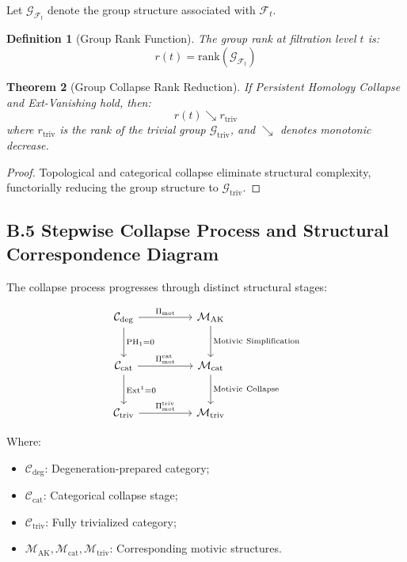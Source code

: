 \documentclass[11pt]{article}
\newtheorem{theorem}{Theorem}[section]
\newtheorem{definition}[theorem]{Definition}
\DeclareMathOperator{\Ext}{Ext}
\begin{document}
Let $\mathcal{G}_{\mathcal{F}_t}$ denote the group structure associated with $\mathcal{F}_t$.

\begin{definition}[Group Rank Function]
The group rank at filtration level $t$ is:
\[
r(t) = \mathrm{rank}(\mathcal{G}_{\mathcal{F}_t})
\]
\end{definition}

\begin{theorem}[Group Collapse Rank Reduction]
If Persistent Homology Collapse and Ext-Vanishing hold, then:
\[
r(t) \searrow r_{\mathrm{triv}}
\]
where $r_{\mathrm{triv}}$ is the rank of the trivial group $\mathcal{G}_{\mathrm{triv}}$, and $\searrow$ denotes monotonic decrease.
\end{theorem}

\begin{proof}
Topological and categorical collapse eliminate structural complexity, functorially reducing the group structure to $\mathcal{G}_{\mathrm{triv}}$.
\end{proof}

\subsection*{B.5 Stepwise Collapse Process and Structural Correspondence Diagram}

The collapse process progresses through distinct structural stages:

\[
\begin{tikzcd}[column sep=huge, row sep=large]
\mathcal{C}_{\mathrm{deg}} \arrow[r, "\Pi_{\mathrm{mot}}"] \arrow[d, "\mathrm{PH}_1 = 0"]
& \mathcal{M}_{\mathrm{AK}} \arrow[d, "\mathrm{Motivic\ Simplification}"] \\
\mathcal{C}_{\mathrm{cat}} \arrow[r, "\Pi_{\mathrm{mot}}^{\mathrm{cat}}"] \arrow[d, "\Ext^1 = 0"]
& \mathcal{M}_{\mathrm{cat}} \arrow[d, "\mathrm{Motivic\ Collapse}"] \\
\mathcal{C}_{\mathrm{triv}} \arrow[r, "\Pi_{\mathrm{mot}}^{\mathrm{triv}}"]
& \mathcal{M}_{\mathrm{triv}}
\end{tikzcd}
\]

Where:

\begin{itemize}
    \item $\mathcal{C}_{\mathrm{deg}}$: Degeneration-prepared category;
    \item $\mathcal{C}_{\mathrm{cat}}$: Categorical collapse stage;
    \item $\mathcal{C}_{\mathrm{triv}}$: Fully trivialized category;
    \item $\mathcal{M}_{\mathrm{AK}}, \mathcal{M}_{\mathrm{cat}}, \mathcal{M}_{\mathrm{triv}}$: Corresponding motivic structures.
\end{itemize}
\end{document}
